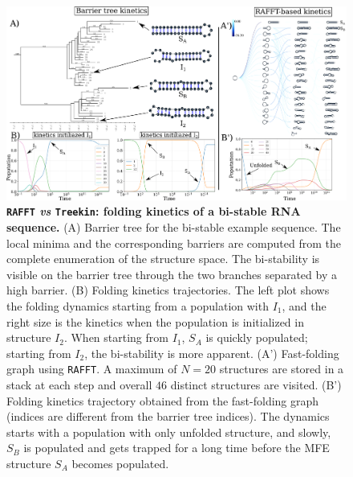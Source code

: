 \begin{figure}[t]
	\centering
	\includegraphics[width=0.9\linewidth]{../res/images/rafft/kine_bi_sta.png}
	\caption{\label{class_examp}\textbf{\texttt{RAFFT} \emph{vs} \texttt{Treekin}: folding kinetics of a bi-stable RNA sequence.} (A) Barrier tree for the bi-stable example sequence. The local minima and the corresponding barriers are computed from the complete enumeration of the structure space. The bi-stability is visible on the barrier tree through the two branches separated by a high barrier.  (B) Folding kinetics trajectories. The left plot shows the folding dynamics starting from a population with $I_1$, and the right size is the kinetics when the population is initialized in structure $I_2$. When starting from $I_1$, $S_A$ is quickly populated; starting from $I_2$, the bi-stability is more apparent.  (A') Fast-folding graph using \texttt{RAFFT}. A maximum of $N=20$ structures are stored in a stack at each step and overall $46$ distinct structures are visited. (B') Folding kinetics trajectory obtained from the fast-folding graph (indices are different from the barrier tree indices). The dynamics starts with a population with only unfolded structure, and slowly, $S_B$ is populated and gets trapped for a long time before the MFE structure $S_A$ becomes populated.}
\end{figure}
